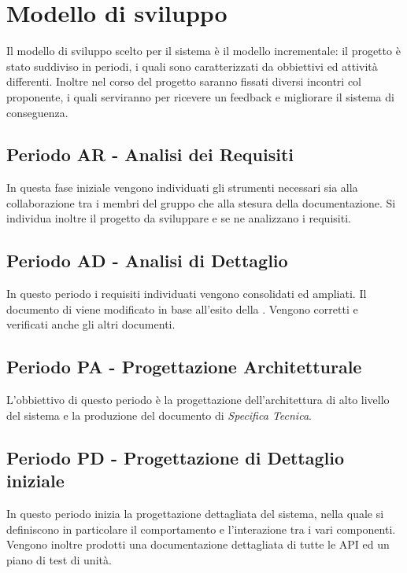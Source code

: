 \documentclass[./PianoDiProgetto.tex]{subfiles}
\begin{document}
  \section{Modello di sviluppo}

  Il modello di sviluppo scelto per il sistema è il modello incrementale: il
  progetto è stato suddiviso in periodi, i quali sono caratterizzati da
  obbiettivi ed attività differenti. Inoltre nel corso del progetto saranno
  fissati diversi incontri col proponente, i quali serviranno per ricevere un
  feedback e migliorare il sistema di conseguenza.

  \subsection{Periodo AR - Analisi dei Requisiti}

  In questa fase iniziale vengono individuati gli strumenti necessari sia alla
  collaborazione tra i membri del gruppo che alla stesura della documentazione.
  Si individua inoltre il progetto da sviluppare e se ne analizzano i requisiti.

  \subsection{Periodo AD - Analisi di Dettaglio}

  In questo periodo i requisiti individuati vengono consolidati ed ampliati. Il
  documento di \ARdoc viene modificato in base all'esito
  della \RR. Vengono corretti e verificati anche gli altri documenti.

  \subsection{Periodo PA - Progettazione Architetturale}

  L'obbiettivo di questo periodo è la progettazione dell'architettura di alto
  livello del sistema e la produzione del documento di \textit{Specifica Tecnica}.

  \subsection{Periodo PD - Progettazione di Dettaglio iniziale}

  In questo periodo inizia la progettazione dettagliata del sistema, nella quale si definiscono
  in particolare il comportamento e l'interazione tra i vari componenti. Vengono
  inoltre prodotti una documentazione dettagliata di tutte le API ed un piano
  di test di unità.
\end{document}
